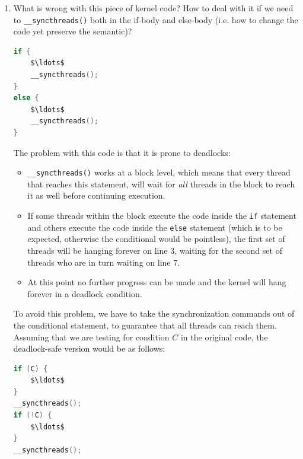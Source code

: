 \documentclass{article}
\begin{document}
\begin{enumerate}[1.]
    \item What is wrong with this piece of kernel code? How to deal with it if we need to
    \texttt{\_\_syncthreads()} both in the if-body and else-body (i.e. how to change the code yet preserve the
    semantic)?
\begin{lstlisting}[language=C, mathescape=true]
if {
    $\ldots$
    __syncthreads();
}
else {
    $\ldots$
    __syncthreads();
}
\end{lstlisting}
    The problem with this code is that it is prone to deadlocks:
    \begin{itemize}
        \item \texttt{\_\_syncthreads()} works at a block level, which means that every thread that reaches this statement, will wait for \emph{all} threads in the block to reach it as well before continuing execution.
        \item If some threads within the block execute the code inside the \texttt{if} statement and others execute the code inside the \texttt{else} statement (which is to be expected, otherwise the conditional would be pointless), the first set of threads will be hanging forever on line 3, waiting for the second set of threads who are in turn waiting on line 7.
        \item At this point no further progress can be made and the kernel will hang forever in a deadlock condition.
    \end{itemize}
    To avoid this problem, we have to take the synchronization commands out of the conditional statement, to guarantee that all threads can reach them. Assuming that we are testing for condition $C$ in the original code, the deadlock-safe version would be as follows:
\begin{lstlisting}[language=C, mathescape=true]
if (C) {
    $\ldots$
}
__syncthreads();
if (!C) {
    $\ldots$
}
__syncthreads();
\end{lstlisting}
\end{enumerate}
\end{document}
